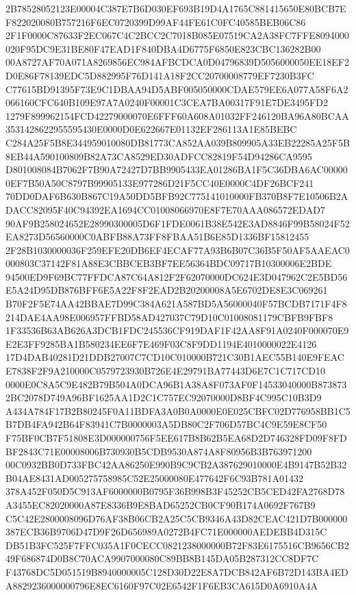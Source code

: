 \documentclass[UTF8,fontset=fandol,zihao=-4,a4paper]{ctexart}
\begin{document}
{{2B78528052123E00004C387E7B6D030EF693B19D4A1765C881415650E80BCB7EF822020080B757216F6EC0720399D99AF44FE61C0FC40585BEB06C86
2F1F0000C87633F2EC067C4C2BCC2C7018B085E07519CA2A38FC7FFE8094000020F95DC9E31BE80F47EAD1F840DBA4D6775F6850E823CBC136282B00
00A8727AF70A071A8269856EC984AFBCDCA0D04796839D5056000050EE18EF2D0E86F78139EDC5D882995F76D141A18F2CC20700008779EF7230B3FC
C77615BD91395F73E9C1DBAA94D5ABF005050000CDAE579EE6A077A58F6A2066160CFC640B109E97A7A0240F00001C3CEA7BA00317F91E7DE3495FD2
1279F899962154FCD42279000070E6FFF60A608A01032FF246120BA96A80BCAA3531428622955595430E0000D0E622667E01132EF286113A1E85BEBC
C284A25F5B8E344959010080DB81773CA852AA039B809905A33EB22285A25F5B8EB44A590100809B82A73CA8529ED30ADFCC82819F54D94286CA9595
D801008084B7062F7B90A72427D7BB9905433EA01286BA1F5C36DBA6AC000000EF7B50A50C8797B99905133E977286D21F5CC40E0000C4DF26BCF241
70DD0DAF6B630B867C19A50DD5BFB92C775141010000FB370B8F7E10506B2ADACC82095F40C94392EA1694CC01008066970E8F7E70AAA086572EDAD7
90AF9B258024652E28990300005D6F1FDE0061B38E542E3AD8846F99B58024F52EA8273D56560000C0ABFB88A73FF8FBAA51B6E85D1336BF15812455
2F28B1030000036F259EFE20DB6EF4ECAF77A93B6B07C36B5F50AF5AAEAC0000803C37142F81A88E3CBBCEB3BF7EE56364BDC09717B10300006E2BDE
94500ED9F69BC77FFDCA87C64A812F2F62070000DC624E3D047962C2E5BD56E5A24D95DB876BFF6E5A22F8F2EAD2B20200008A5E6702DE8E3C069261
B70F2F5E74AA42BBAE7D99C384A621A587BD5A56000040F57BCDB7171F4F8214DAE4AA98E006957FFBD58AD427037C79D10C01008081179CBFB9FBF8
1F33536B63AB626A3DCB1FDC245536CF919DAF1F42AA8F91A0240F000070E9E2E3FF9285BA1B580234EE6F7E469F03C8F9DD1194E4010000022E4126
17D4DAB40281D21DDB27007C7CD10C010000B721C30B1AEC55B140E9FEACE7838F2F9A210000C0579723930B726E4E29791BA77443D6E7C1C717CD10
0000E0C8A5C9E482B79B504A0DCA96B1A38A8F073AF0F14533040000B8738732BC2078D749A96BF1625AA1D2C1C757EC92070000D8BF4C995C10B3D9
A434A784F17B2B80245F0A11BDFA3A0B0A0000E0E025CBFC02D776958BB1C5B7DB4FA942B64F83941C7B0000003A5DB80C2F706D57BC4C9E59E8CF50
F75BF0CB7F51808E3D000000756F5EE617B8B62B5EA68D2D746328FD09F8FDBF2843C71E00008006B730930B5CDB9530A874A8F80956B3B763971200
00C0932BB0D733FBC42AA86250E990B9C9CB2A387629010000E4B9147B52B32B04AE8431AD005275758985C52E25000080E477642F6C93B781A01432
378A452F050D5C913AF6000000B0795F36B998B3F45252CB5CED42FA2768D78A3455EC82020000A87E8336B9E8BAD65252CB0CF90B174A0692F767B9
C5C42E2800008096D76AF38B06CB2A25C5CB9346A43D82CEAC421D7B000000387ECB36B9706D47D9F26D656989A0272B4FC71E000000AEDEBB4D315C
DB51B3FC525F7FFC035A1F0CECC0821238000000B72F83E6175516CB9656CB249F686874D0B8C70ACA9907000080C89BB8B145DA05B287312CC8DF7C
F43768DC5D051519B8940000005C128D30D22E8A7DCB842AF6B72D143BA4EDA8829236000000796E8EC6160F97C02E6542F1F6EB3CA615D0A6910A4A
}}
\end{document}
